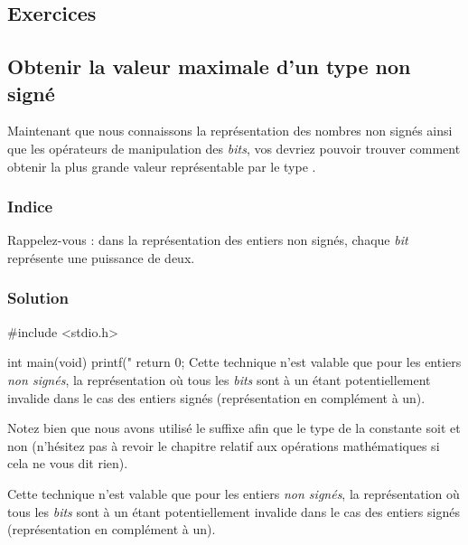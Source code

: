 \begin{infobox}
\section{Exercices}
\label{exercices-3}

\subsection{Obtenir la valeur maximale d'un type non signé}
\label{obtenir-la-valeur-maximale-dun-type-non-signe}

Maintenant que nous connaissons la représentation des nombres non signés
ainsi que les opérateurs de manipulation des \emph{bits}, vos devriez
pouvoir trouver comment obtenir la plus grande valeur représentable par
le type .

\subsubsection{Indice}
\label{indice-1}

\begin{secretbox}
Rappelez-vous : dans la représentation des entiers non signés, chaque 
\emph{bit} représente une puissance de deux.
\end{secretbox}


\subsubsection{Solution}
\label{solution-1}

\begin{C}
#include <stdio.h>


int main(void)
{
    printf("%
    return 0;
}Cette technique n'est valable que pour les entiers
\emph{non signés}, la représentation où tous les \emph{bits} sont à un
étant potentiellement invalide dans le cas des entiers signés
(représentation en complément à un).
\end{C}

\begin{attentionbox} 
 Notez bien que nous avons utilisé le suffixe  afin que le type de la
constante  soit  et non 
(n'hésitez pas à revoir le chapitre relatif aux opérations mathématiques
si cela ne vous dit rien).
\end{attentionbox}

\begin{erreurbox}
 Cette technique n'est valable que pour les entiers
\emph{non signés}, la représentation où tous les \emph{bits} sont à un
étant potentiellement invalide dans le cas des entiers signés
(représentation en complément à un).
\end{erreurbox}


\end{infobox}

